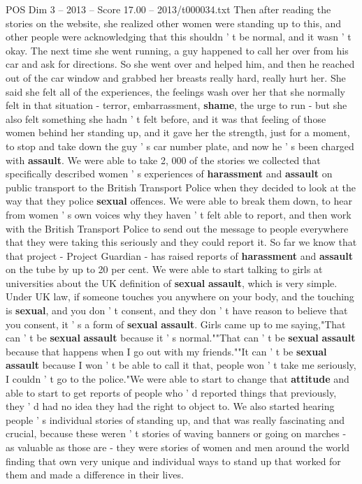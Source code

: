 \begin{textsample}{POS Dim 3 – 2013 – Score 17.00 – 2013/t000034.txt}
Then after reading the stories on the website, she realized other women were standing up to this, and other people were acknowledging that this shouldn ' t be normal, and it wasn ' t okay.
The next time she went running, a guy happened to call her over from his car and ask for directions.
So she went over and helped him, and then he reached out of the car window and grabbed her breasts really hard, really hurt her.
She said she felt all of the experiences, the feelings wash over her that she normally felt in that situation - terror, embarrassment, \textbf{shame}, the urge to run - but she also felt something she hadn ' t felt before, and it was that feeling of those women behind her standing up, and it gave her the strength, just for a moment, to stop and take down the guy ' s car number plate, and now he ' s been charged with \textbf{assault}.
We were able to take 2, 000 of the stories we collected that specifically described women ' s experiences of \textbf{harassment} and \textbf{assault} on public transport to the British Transport Police when they decided to look at the way that they police \textbf{sexual} offences.
We were able to break them down, to hear from women ' s own voices why they haven ' t felt able to report, and then work with the British Transport Police to send out the message to people everywhere that they were taking this seriously and they could report it.
So far we know that that project - Project Guardian - has raised reports of \textbf{harassment} and \textbf{assault} on the tube by up to 20 per cent.
We were able to start talking to girls at universities about the UK definition of \textbf{sexual} \textbf{assault}, which is very simple.
Under UK law, if someone touches you anywhere on your body, and the touching is \textbf{sexual}, and you don ' t consent, and they don ' t have reason to believe that you consent, it ' s a form of \textbf{sexual} \textbf{assault}.
Girls came up to me saying,"That can ' t be \textbf{sexual} \textbf{assault} because it ' s normal.""That can ' t be \textbf{sexual} \textbf{assault} because that happens when I go out with my friends.""It can ' t be \textbf{sexual} \textbf{assault} because I won ' t be able to call it that, people won ' t take me seriously, I couldn ' t go to the police."We were able to start to change that \textbf{attitude} and able to start to get reports of people who ' d reported things that previously, they ' d had no idea they had the right to object to.
We also started hearing people ' s individual stories of standing up, and that was really fascinating and crucial, because these weren ' t stories of waving banners or going on marches - as valuable as those are - they were stories of women and men around the world finding that own very unique and individual ways to stand up that worked for them and made a difference in their lives.

\end{textsample}

